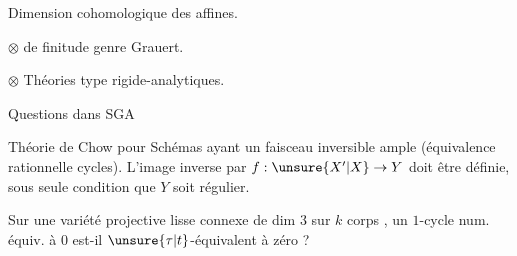 Dimension cohomologique des  affines.

$\otimes$  de finitude genre Grauert.

$\otimes$ Théories  type rigide-analytiques.

Questions dans SGA 


 Théorie de Chow pour Schémas  ayant un faisceau inversible ample (équivalence rationnelle \unsure{,} cycles). L'image inverse par $f:\unsure{X'|X}\to Y$ doit être définie, sous seule condition que $Y$ soit régulier.

\hspace{.4em}Sur une variété projective lisse connexe de dim $3$ sur $k$ corps  , un $1$-cycle num. équiv. à $0$ est-il $\unsure{\tau|t}$-équivalent à zéro ? 
\normalmarginpar

